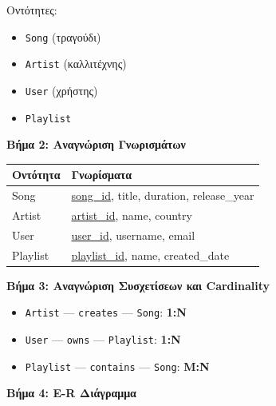 Οντότητες:
\begin{itemize}
    \item \texttt{Song} (τραγούδι)
    \item \texttt{Artist} (καλλιτέχνης)
    \item \texttt{User} (χρήστης)
    \item \texttt{Playlist}
\end{itemize}

\textbf{Βήμα 2: Αναγνώριση Γνωρισμάτων}

\begin{center}
\begin{tabular}{ll}
\toprule
\textbf{Οντότητα} & \textbf{Γνωρίσματα} \\
\midrule
Song & \underline{song\_id}, title, duration, release\_year \\
Artist & \underline{artist\_id}, name, country \\
User & \underline{user\_id}, username, email \\
Playlist & \underline{playlist\_id}, name, created\_date \\
\bottomrule
\end{tabular}
\end{center}

\textbf{Βήμα 3: Αναγνώριση Συσχετίσεων και Cardinality}

\begin{itemize}
    \item \texttt{Artist} --- \texttt{creates} --- \texttt{Song}: \textbf{1:N}
    \item \texttt{User} --- \texttt{owns} --- \texttt{Playlist}: \textbf{1:N}
    \item \texttt{Playlist} --- \texttt{contains} --- \texttt{Song}: \textbf{M:N}
\end{itemize}

\textbf{Βήμα 4: E-R Διάγραμμα}

